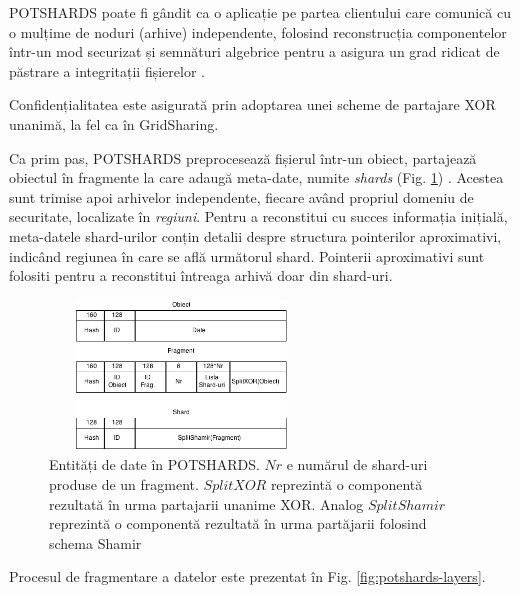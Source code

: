 \documentclass[oneside, 12pt]{book}
\begin{document}
POTSHARDS poate fi gândit ca o aplicație pe partea clientului care comunică cu o mulțime de noduri (arhive) independente, folosind reconstrucția componentelor într-un mod securizat și semnături algebrice pentru a asigura un grad ridicat de păstrare a integritații fișierelor \cite{STM:2006}.

Confidențialitatea este asigurată prin adoptarea unei scheme de partajare XOR unanimă, la fel ca în GridSharing.

Ca prim pas, POTSHARDS preprocesează fișierul într-un obiect, partajează obiectul în fragmente la care adaugă meta-date, numite \textit{shards} (Fig. \ref{fig:data-potshard}) \cite{SGMV:2009}. Acestea sunt trimise apoi arhivelor independente, fiecare având propriul domeniu de securitate, localizate în \textit{regiuni}. Pentru a reconstitui cu succes informația inițială, meta-datele shard-urilor conțin detalii despre structura pointerilor aproximativi, indicând regiunea în care se află următorul shard. Pointerii aproximativi sunt folositi pentru a reconstitui întreaga arhivă doar din shard-uri.

\begin{figure}[b!]
	\begin{center}
	\includegraphics[width=7cm, height=4cm]{img/Shards.png}    %
	\caption{Entități de date în POTSHARDS. $Nr$ e numărul de shard-uri produse de un fragment.
		$SplitXOR$ reprezintă o componentă rezultată în urma partajarii unanime XOR. Analog $SplitShamir$ reprezintă o componentă rezultată în urma partăjarii folosind schema Shamir \cite{SGMV:2009}}
	\label{fig:data-potshard}
	\bigskip
	\end{center}
\end{figure}

Procesul de fragmentare a datelor este prezentat în Fig. \ref{fig:potshards-layers}.
\end{document}
